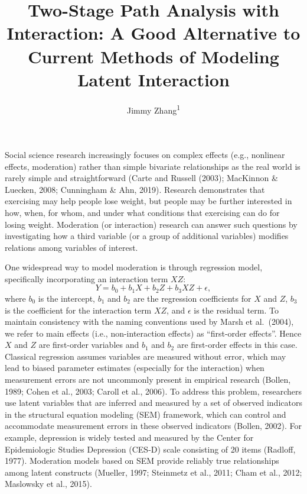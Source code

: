 \documentclass[
  man]{apa6}
\title{Two-Stage Path Analysis with Interaction: A Good Alternative to Current Methods of Modeling Latent Interaction}
\author{Jimmy Zhang\textsuperscript{1}}
\date{}
\affiliation{\vspace{0.5cm}\textsuperscript{1} University of Southhern California}
\begin{document}
\maketitle

Social science research increasingly focuses on complex effects (e.g., nonlinear effects, moderation) rather than simple bivariate relationships as the real world is rarely simple and straightforward (Carte and Russell (2003); MacKinnon \& Luecken, 2008; Cunningham \& Ahn, 2019). Research demonstrates that exercising may help people lose weight, but people may be further interested in how, when, for whom, and under what conditions that exercising can do for losing weight. Moderation (or interaction) research can answer such questions by investigating how a third variable (or a group of additional variables) modifies relations among variables of interest.

One widespread way to model moderation is through regression model, specifically incorporating an interaction term \(XZ\):
\begin{equation}
Y = b_{0} + b_{1}X + b_{2}Z + b_{3}XZ + \epsilon,
\end{equation}
where \(b_{0}\) is the intercept, \(b_{1}\) and \(b_{2}\) are the regression coefficients for \(X\) and \(Z\), \(b_{3}\) is the coefficient for the interaction term \(XZ\), and \(\epsilon\) is the residual term. To maintain consistency with the naming conventions used by Marsh et al.~(2004), we refer to main effects (i.e., non-interaction effects) as ``first-order effects''. Hence \(X\) and \(Z\) are first-order variables and \(b_{1}\) and \(b_{2}\) are first-order effects in this case. Classical regression assumes variables are measured without error, which may lead to biased parameter estimates (especially for the interaction) when measurement errors are not uncommonly present in empirical research (Bollen, 1989; Cohen et al., 2003; Caroll et al., 2006). To address this problem, researchers use latent variables that are inferred and measured by a set of observed indicators in the structural equation modeling (SEM) framework, which can control and accommodate measurement errors in these observed indicators (Bollen, 2002). For example, depression is widely tested and measured by the Center for Epidemiologic Studies Depression (CES-D) scale consisting of 20 items (Radloff, 1977). Moderation models based on SEM provide reliably true relationships among latent constructs (Mueller, 1997; Steinmetz et al., 2011; Cham et al., 2012; Maslowsky et al., 2015).
\end{document}
